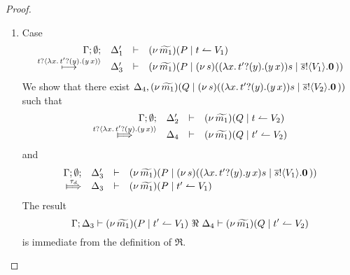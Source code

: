 \begin{proof}
\begin{enumerate}
\begin{enumerate}
\begin{eqnarray*}
								\horel{\Gamma}{\Delta_1''}{\newsp{\widetilde{m_1}}{P' \Par \newsp{s}{\bout{t'}{s} \inact} }}
								{\fwb}
								{\Delta_2''}{\newsp{\widetilde{m_2}}{Q'}  \Par \newsp{s}{\bout{t'}{s} \inact}}
								\label{proof:trig_equiv3}
							\end{eqnarray*}
							The freshness of $t$ allows us to mimic the transitions
							in \eqref{proof:trig_equiv2} to get that for $\Delta_4$
							\begin{eqnarray*}
								\begin{array}{crll}
									& \Gamma; \es; \Delta_2' & \proves &		
									\newsp{\widetilde{m_2}}{Q \Par \ntrigger{t}{V_2}}
									\\
									\Hby{} &&&
									\newsp{\widetilde{m_2}}{Q_2 \Par \ntrigger{t}{V_2}}
									\\
									{\hby{\bactinp{t}{\omapchar{\btinp{U} \tinact}}}}& & &
									\newsp{\widetilde{m_2}}{Q_2 \Par \newsp{s}{\appl{\omapchar{\btinp{U} \tinact}}{s} \Par \bout{\dual{s}}{V_2} \inact}}
									\\
									\Hby{} & \Delta_4 & \proves & \newsp{\widetilde{m_2}'}{Q' \Par \newsp{s}{\bout{t'}{s} \inact} }
								\end{array}
							\end{eqnarray*}
							and 
							\[
								\horel{\Gamma}{\Delta_3}{\newsp{\widetilde{m_1}}{P \Par \newsp{s}{ \appl{\omapchar{\btinp{U} \tinact}}{s} \Par \bout{\dual{s}}{V_1} \inact}}}
								{\Hby{\dtau}}
								{\Delta_3}{\newsp{\widetilde{m_1}'}{P' \Par \newsp{s}{ \bout{t'}{s} \inact}}}
							\]
							The conclusion is immediate from \eqref{proof:trig_equiv3}.

					\item	Case
						\[
							\begin{array}{rcll} \Gamma; \emptyset; &\Delta_1'& \vdash& (\nu\, \widetilde{m_1})(P \;|\; t \leftharpoonup V_1)\\ \stackrel{t ? \langle  \lambda x.\,t' ? (y) .{(y\, {x})}  \rangle}{\longmapsto} &\Delta_3'& \vdash &  (\nu\, \widetilde{m_1})(P \;|\; (\nu\, s)(  (\lambda x.\,t' ? (y) .{(y\, {x})}){s}  \;|\; \overline{s} ! \langle V_1 \rangle . \mathbf{0} \, {)}) \end{array}
						\]
						We show that there
                                                exist $\Delta_4, (\nu\, \widetilde{m_1})(Q \;|\; (\nu\, s)(  (\lambda x.\,t' ? (y) .{(y\, {x})}){s}  \;|\; \overline{s} ! \langle V_2 \rangle . \mathbf{0} \, {)})$ such that
						\[
							\mhorel{\Gamma}{\Delta_2'}{\newsp{\widetilde{m_1}}{Q \Par \ntrigger{t}{V_2}}}
							{\Hby{\bactinp{t}{ \abs{x}{\binp{t'}{y}{(\appl{y}{x})}  }}}}
							{\Delta_4}{}{\newsp{\widetilde{m_1}}{Q \Par \ntrigger{t'}{V_2} }}
						\]
						and
						\[
							\mhorel{\Gamma}{\Delta_3'}{\newsp{\widetilde{m_1}}{P \Par \newsp{s}{ \appl{(\abs{x}{\binp{t'}{y}{\appl{y}{x}})}{s}  \Par \bout{\dual{s}}{V_1} \inact }}}}
							{\Hby{\tau_d}}
							{\Delta_3}{}{\newsp{\widetilde{m_1}}{P \Par \ntrigger{t'}{V_1}}}
						\]
						The result
						\[
							\Gamma; \Delta_3 \vdash (\nu\, \widetilde{m_1})(P \;|\; t' \leftharpoonup V_1) \ \Re\  \Delta_4 \vdash (\nu\, \widetilde{m_1})(Q \;|\; t' \leftharpoonup V_2)
						\]
						is immediate from the definition of $\Re$.


\end{enumerate}
\end{enumerate}
\end{proof}
